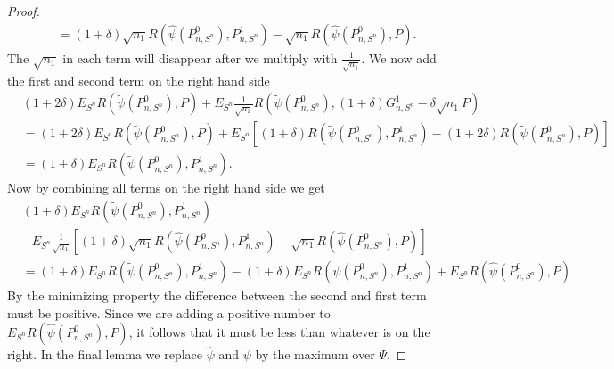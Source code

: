 \documentclass[11pt, a4paper]{article}
\theoremstyle{definition}
\theoremstyle{remark}
\newcommand{\la}{\psi}
\newcommand{\Sn}{S^n}
\newcommand{\lib}{\Psi}
\begin{document}
\begin{proof}
\begin{align*}
       &=(1 + \delta) \sqrt{n_1} R(\hat{\la} (P_{n, \Sn}^{0}), P_{n,\Sn}^{1}) - \sqrt{n_1}   R(\hat{\la} (P_{n, \Sn}^{0}), P).
  \end{align*}
  The $ \sqrt{n_1} $ in each term will disappear after we multiply with $ \frac{1}{\sqrt{n_1}} $. We now add the first and second term on the right hand side 
  \begin{align*}
      &(1 + 2 \delta) E_{\Sn} R( \tilde{\la}(P_{n, \Sn}^{0}) , P ) +E_{\Sn} \frac{1}{\sqrt{n_1} } R(\tilde{\la} (P_{n, \Sn}^{0}), (1 + \delta) G_{n,\Sn}^{1} - \delta \sqrt{n_1} P)\\ 
      &= (1 + 2 \delta) E_{\Sn} R( \tilde{\la}(P_{n, \Sn}^{0}) , P ) + E_{\Sn} \left[(1 + \delta) R(\tilde{\la} (P_{n, \Sn}^{0}), P_{n,\Sn}^{1}) - (1 + 2\delta)R(\tilde{\la} (P_{n, \Sn}^{0}), P) \right]\\
      &=(1 + \delta) E_{\Sn} R(\tilde{\la} (P_{n, \Sn}^{0}), P_{n,\Sn}^{1}).
  \end{align*}
Now by combining all terms on the right hand side we get
\begin{align*}
    &(1 + \delta) E_{\Sn} R(\tilde{\la} (P_{n, \Sn}^{0}), P_{n,\Sn}^{1})\\
    &-E_{\Sn} \frac{1}{\sqrt{n_1} } \left[ (1 + \delta) \sqrt{n_1} R(\hat{\la} (P_{n, \Sn}^{0}), P_{n,\Sn}^{1}) - \sqrt{n_1}   R(\hat{\la} (P_{n, \Sn}^{0}), P) \right] \\
    &= (1 + \delta) E_{\Sn} R(\tilde{\la} (P_{n, \Sn}^{0}), P_{n,\Sn}^{1})- (1 + \delta)E_{\Sn}R(\hat{\la} (P_{n, \Sn}^{0}), P_{n,\Sn}^{1})+ E_{\Sn} R(\hat{\la} (P_{n, \Sn}^{0}), P)
\end{align*}
By the minimizing property the difference between the second and first term must be positive. Since we are adding a positive number to $ E_{\Sn} R(\hat{\la} (P_{n, \Sn}^{0}), P) $, it follows that it must be less than whatever is on the right. In the final lemma we replace $ \hat{\la}  $ and $ \tilde{\la}  $ by the maximum over $ \lib $.  
  
\end{proof}
\printbibliography
\end{document}
